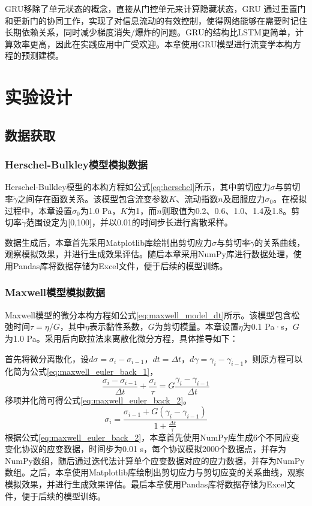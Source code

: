 GRU移除了单元状态的概念，直接从门控单元来计算隐藏状态，GRU 通过重置门和更新门的协同工作，实现了对信息流动的有效控制，使得网络能够在需要时记住长期依赖关系，同时减少梯度消失/爆炸的问题。GRU的结构比LSTM更简单，计算效率更高，因此在实践应用中广受欢迎。本章使用GRU模型进行流变学本构方程的预测建模。

\section{实验设计}
\subsection{数据获取}
\subsubsection{Herschel-Bulkley模型模拟数据}
Herschel-Bulkley模型的本构方程如公式\eqref{eq:herschel}所示，其中剪切应力$\sigma$与剪切率$\dot{\gamma}$之间存在函数关系。该模型包含流变参数$K$、流动指数$n$及屈服应力$\sigma_0$。在模拟过程中，本章设置$\sigma_0$为1.0 Pa，$K$为1，而$n$则取值为0.2、0.6、1.0、1.4及1.8。剪切率$\dot{\gamma}$范围设定为[0,100]，并以0.01的时间步长进行离散采样。

数据生成后，本章首先采用Matplotlib库绘制出剪切应力$\sigma$与剪切率$\dot{\gamma}$的关系曲线，观察模拟效果，并进行生成效果评估。随后本章采用NumPy库进行数据处理，使用Pandas库将数据存储为Excel文件，便于后续的模型训练。
\subsubsection{Maxwell模型模拟数据}
Maxwell模型的微分本构方程如公式\eqref{eq:maxwell_model_dt}所示。该模型包含松弛时间$\tau=\eta/G$，其中$\eta$表示黏性系数，$G$为剪切模量。本章设置$\eta$为0.1 Pa·s，$G$为1.0 Pa。采用后向欧拉法来离散化微分方程，具体推导如下：

首先将微分离散化，设$d\sigma=\sigma_i - \sigma_{i-1}$，$dt=\Delta t$，$d\gamma=\gamma_i - \gamma_{i-1}$，则原方程可以化简为公式\eqref{eq:maxwell_euler_back_1}，
\begin{equation}
  \frac{\sigma_i - \sigma_{i-1}}{\Delta t} + \frac{\sigma_i}{\tau} = G \frac{\gamma_i - \gamma_{i-1}}{\Delta t} \label{eq:maxwell_euler_back_1}
\end{equation}
移项并化简可得公式\eqref{eq:maxwell_euler_back_2}。
\begin{equation}
  \sigma_i = \frac{\sigma_{i-1} + G (\gamma_i - \gamma_{i-1})}{1 + \frac{\Delta t}{\tau}} \label{eq:maxwell_euler_back_2}
\end{equation}
根据公式\eqref{eq:maxwell_euler_back_2}，本章首先使用NumPy库生成6个不同应变变化协议的应变数据，时间步为0.01 s，每个协议模拟2000个数据点，并存为NumPy数组，随后通过迭代法计算单个应变数据对应的应力数据，并存为NumPy数组。之后，本章使用Matplotlib库绘制出剪切应力与剪切应变的关系曲线，观察模拟效果，并进行生成效果评估。最后本章使用Pandas库将数据存储为Excel文件，便于后续的模型训练。
